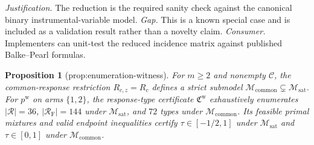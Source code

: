\documentclass{article}
\newtheorem{proposition}{Proposition}
\begin{document}
\par\smallskip\noindent \textit{Justification.} The reduction is the required sanity check against the canonical binary instrumental-variable model. \textit{Gap.} This is a known special case and is included as a validation result rather than a novelty claim. \textit{Consumer.} Implementers can unit-test the reduced incidence matrix against published Balke--Pearl formulas.

\begin{proposition}[prop:enumeration-witness]\label{prop:enumeration-witness}
For \(m\ge2\) and nonempty \(\mathcal C\), the common-response restriction \(R_{c,z}=R_c\) defines a strict submodel \(\mathcal M_{\mathrm{common}}\subsetneq\mathcal M_{\mathrm{sat}}\). For \(p^{\mathrm w}\) on arms \(\{1,2\}\), the response-type certificate \(\mathfrak C^{\mathrm w}\) exhaustively enumerates \(|\mathcal R|=36\), \(|\mathcal R_{\mathrm F}|=144\) under \(\mathcal M_{\mathrm{sat}}\), and \(72\) types under \(\mathcal M_{\mathrm{common}}\). Its feasible primal mixtures and valid endpoint inequalities certify \(\tau\in[-1/2,1]\) under \(\mathcal M_{\mathrm{sat}}\) and \(\tau\in[0,1]\) under \(\mathcal M_{\mathrm{common}}\).
\end{proposition}
\end{document}
